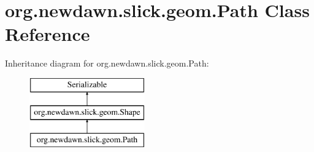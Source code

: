 \hypertarget{classorg_1_1newdawn_1_1slick_1_1geom_1_1_path}{}\section{org.\+newdawn.\+slick.\+geom.\+Path Class Reference}
\label{classorg_1_1newdawn_1_1slick_1_1geom_1_1_path}
Inheritance diagram for org.\+newdawn.\+slick.\+geom.\+Path\+:\begin{figure}[H]
\begin{center}
\leavevmode
\includegraphics[height=3.000000cm]{classorg_1_1newdawn_1_1slick_1_1geom_1_1_path}
\end{center}
\end{figure}
